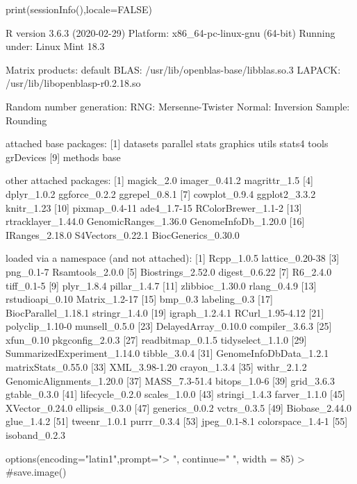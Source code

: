 \documentclass[a4paper,10pt]{article}
\begin{document}
\begin{Schunk}
\begin{Sinput}
  print(sessionInfo(),locale=FALSE)
\end{Sinput}
\begin{Soutput}
R version 3.6.3 (2020-02-29)
Platform: x86_64-pc-linux-gnu (64-bit)
Running under: Linux Mint 18.3

Matrix products: default
BLAS:   /usr/lib/openblas-base/libblas.so.3
LAPACK: /usr/lib/libopenblasp-r0.2.18.so

Random number generation:
 RNG:     Mersenne-Twister 
 Normal:  Inversion 
 Sample:  Rounding 
 
attached base packages:
 [1] datasets  parallel  stats     graphics  utils     stats4    tools     grDevices
 [9] methods   base     

other attached packages:
 [1] magick_2.0           imager_0.41.2        magrittr_1.5        
 [4] dplyr_1.0.2          ggforce_0.2.2        ggrepel_0.8.1       
 [7] cowplot_0.9.4        ggplot2_3.3.2        knitr_1.23          
[10] pixmap_0.4-11        ade4_1.7-15          RColorBrewer_1.1-2  
[13] rtracklayer_1.44.0   GenomicRanges_1.36.0 GenomeInfoDb_1.20.0 
[16] IRanges_2.18.0       S4Vectors_0.22.1     BiocGenerics_0.30.0 

loaded via a namespace (and not attached):
 [1] Rcpp_1.0.5                  lattice_0.20-38            
 [3] png_0.1-7                   Rsamtools_2.0.0            
 [5] Biostrings_2.52.0           digest_0.6.22              
 [7] R6_2.4.0                    tiff_0.1-5                 
 [9] plyr_1.8.4                  pillar_1.4.7               
[11] zlibbioc_1.30.0             rlang_0.4.9                
[13] rstudioapi_0.10             Matrix_1.2-17              
[15] bmp_0.3                     labeling_0.3               
[17] BiocParallel_1.18.1         stringr_1.4.0              
[19] igraph_1.2.4.1              RCurl_1.95-4.12            
[21] polyclip_1.10-0             munsell_0.5.0              
[23] DelayedArray_0.10.0         compiler_3.6.3             
[25] xfun_0.10                   pkgconfig_2.0.3            
[27] readbitmap_0.1.5            tidyselect_1.1.0           
[29] SummarizedExperiment_1.14.0 tibble_3.0.4               
[31] GenomeInfoDbData_1.2.1      matrixStats_0.55.0         
[33] XML_3.98-1.20               crayon_1.3.4               
[35] withr_2.1.2                 GenomicAlignments_1.20.0   
[37] MASS_7.3-51.4               bitops_1.0-6               
[39] grid_3.6.3                  gtable_0.3.0               
[41] lifecycle_0.2.0             scales_1.0.0               
[43] stringi_1.4.3               farver_1.1.0               
[45] XVector_0.24.0              ellipsis_0.3.0             
[47] generics_0.0.2              vctrs_0.3.5                
[49] Biobase_2.44.0              glue_1.4.2                 
[51] tweenr_1.0.1                purrr_0.3.4                
[53] jpeg_0.1-8.1                colorspace_1.4-1           
[55] isoband_0.2.3              
\end{Soutput}
\begin{Sinput}
  options(encoding="latin1",prompt=">  ", continue=" ", width = 85)
>  #save.image()
\end{Sinput}
\end{Schunk}
\end{document}
